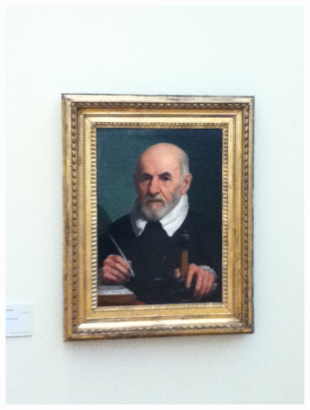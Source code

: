 \begin{figure}
  \begin{minipage}[c]{.33\linewidth}
    \centering
    \includegraphics[width=\textwidth, angle=270]{figures/1C-0454.JPG}
  \end{minipage} \hfill
  \begin{minipage}[c]{.33\linewidth}
    \centering

\end{minipage}
\end{figure}
